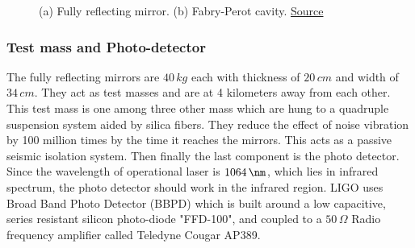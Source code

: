 \begin{figure}[h]
    \centering
    \qquad
    \caption{(a) Fully reflecting mirror.\cite{mirrors} (b) Fabry-Perot cavity. \href{https://www.ligo.caltech.edu/page/ligos-ifo}{Source}}
\end{figure}


\subsubsection{Test mass and Photo-detector}

The fully reflecting mirrors are $40 \,kg$ each with thickness of $20\,cm$ and width of $34\,cm$. They act as test masses and are at 4 kilometers away from each other. This test mass is one among three other mass which are hung to a quadruple suspension system aided by silica fibers. They reduce the effect of noise vibration by 100 million times by the time it reaches the mirrors. This acts as a passive seismic isolation system. \cite{mirrors} Then finally the last component is the photo detector. Since the wavelength of operational laser is $1064\,\nm$, which lies in infrared spectrum, the photo detector should work in the infrared region. LIGO uses Broad Band Photo Detector (BBPD) which is built around a low capacitive, series resistant silicon photo-diode "FFD-100", and coupled to a $50\,\Omega$  Radio frequency amplifier called Teledyne Cougar AP389. \cite{BBPD}

\pagebreak
